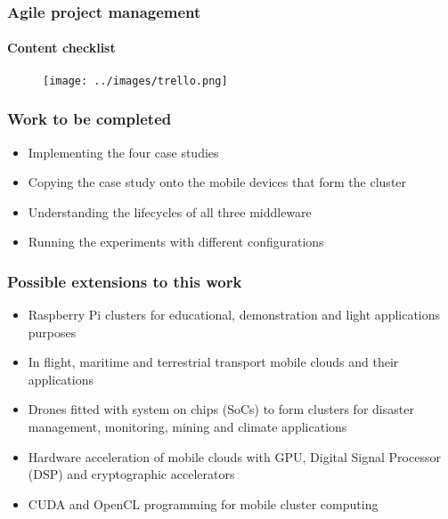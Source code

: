 \documentclass[11pt]{beamer}
\begin{document}
\begin{frame}
\frametitle{Agile project management}
\framesubtitle{Content checklist}
\begin{figure}[h]
	\centering
	\texttt{[image: ../images/trello.png]}
	\label{trello}
\end{figure}
\end{frame}

\begin{frame}
\frametitle{Work to be completed}
\begin{itemize}
	\item Implementing the four case studies
	\item Copying the case study onto the mobile devices that form the cluster
	\item Understanding the lifecycles of all three middleware
	\item Running the experiments with different configurations
\end{itemize}
\end{frame}

\begin{frame}
\frametitle{Possible extensions to this work}
\begin{itemize}
	\item Raspberry Pi clusters for educational, demonstration and light applications purposes
	\item In flight, maritime and terrestrial transport mobile clouds and their applications
	\item Drones fitted with system on chips (SoCs) to form clusters for disaster management, monitoring, mining and climate applications
	\item Hardware acceleration of mobile clouds with GPU, Digital Signal Processor (DSP) and cryptographic accelerators
	\item CUDA and OpenCL programming for mobile cluster computing
\end{itemize}
\end{frame}
\end{document}
